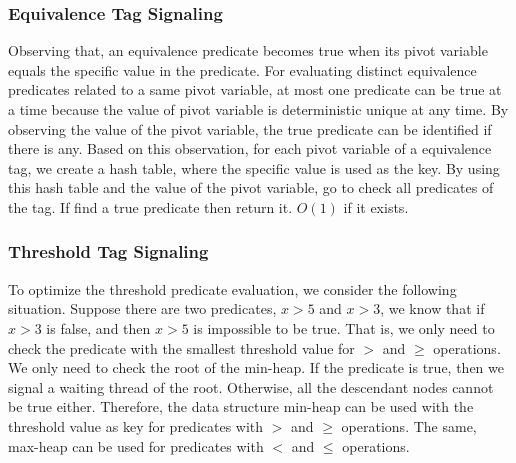 \documentclass[preprint]{sigplanconf}
\begin{document}
\subsubsection{Equivalence Tag Signaling}
Observing that, an equivalence predicate becomes true when its pivot variable 
equals the specific value in the predicate. For evaluating distinct
equivalence predicates related to a same pivot variable, at most one
predicate can be true at a time because the value of pivot variable is 
deterministic unique at any time. By observing the value of the pivot variable, 
the true predicate can be identified if there is any. Based on this 
observation, for each pivot variable of a equivalence tag, we create a 
hash table, where the specific value is used as the key. By using this hash 
table and the value of the pivot variable, go to check all predicates of the
tag. If find a true predicate then return it.  
$O(1)$ if it exists.


\subsubsection{Threshold Tag Signaling}

To optimize the threshold predicate evaluation, we consider the following
situation. Suppose there are two predicates, $x > 5$ and $x > 3$, we know 
that if $x > 3$ is false, and then $x > 5$ is impossible to be true. That is,
we only need to check the predicate with the smallest threshold value for $>$
and $\ge$ operations. We only need to check the root of the min-heap. If the 
predicate is true, then we signal a waiting thread of the root. Otherwise, all 
the descendant nodes cannot be true either.  Therefore, the data structure 
min-heap can be used with 
the threshold value as key for predicates with $>$ and $\ge$ operations. The 
same, max-heap can be used for predicates with $<$ and $\le$ operations.
\end{document}
